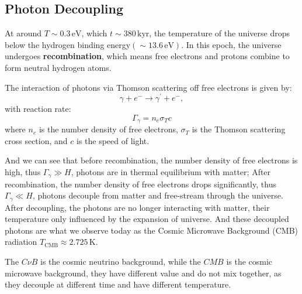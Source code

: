 \bigskip\noindent \bigskip\noindent  \bigskip\noindent 
\subsection{Photon Decoupling}
At around $T \sim 0.3\,\mathrm{eV}$, which $t \sim 380\,\mathrm{kyr}$, the temperature of the universe drops below the hydrogen binding energy$(\sim 13.6\,\mathrm{eV})$. In this epoch, the universe undergoes \textbf{recombination}, which means free electrons and protons combine to form neutral hydrogen atoms.

\bigskip\noindent
\begin{theory}
    The interaction of photons via Thomson scattering off free electrons is given by:
    \[
        \gamma + e^- \rightarrow \gamma^\prime + e^-,
    \]
    with reaction rate:
    \[
        \Gamma_\gamma = n_e \sigma_T c
    \]
    where $n_e$ is the number density of free electrons, $\sigma_T$ is the Thomson scattering cross section, and $c$ is the speed of light. \\
\end{theory}

And we can see that before recombination, the number density of free electrons is high, thus $\Gamma_\gamma \gg H$, photons are in thermal equilibrium with matter; After recombination, the number density of free electrons drops significantly, thus $\Gamma_\gamma \ll H$, photons decouple from matter and free-stream through the universe. \\

After decoupling, the photons are no longer interacting with matter, their temperature only influenced by the expansion of universe. And these decoupled photons are what we observe today as the Cosmic Microwave Background (CMB) radiation $T_\text{CMB} \approx 2.725\,\mathrm{K}$.

\clearpage
\begin{importantnote}
    The $C \nu B$ is the cosmic neutrino background, while the $CMB$ is the cosmic microwave background, they have different value and do not mix together, as they decouple at different time and have different temperature. \\
\end{importantnote}


